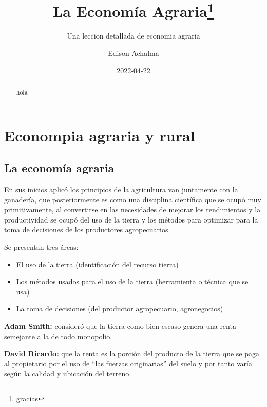 \documentclass[
  letterpaper,
  DIV=11,
  numbers=noendperiod]{scrartcl}
\title{La Economía Agraria\thanks{gracias}}
\subtitle{Una leccion detallada de economia agraria}
\author{Edison Achalma}
\date{2022-04-22}
\begin{document}
\maketitle
\begin{abstract}
hola
\end{abstract}
\ifdefined\Shaded\renewenvironment{Shaded}{\begin{tcolorbox}[frame hidden, enhanced, boxrule=0pt, borderline west={3pt}{0pt}{shadecolor}, interior hidden, sharp corners, breakable]}{\end{tcolorbox}}\fi

\hypertarget{econompia-agraria-y-rural}{%
\section{Econompia agraria y rural}\label{econompia-agraria-y-rural}}

\hypertarget{la-economuxeda-agraria}{%
\subsection{La economía agraria}\label{la-economuxeda-agraria}}

En sus inicios aplicó los principios de la agricultura van juntamente
con la ganadería, que posteriormente es como una disciplina científica
que se ocupó muy primitivamente, al convertirse en las necesidades de
mejorar los rendimientos y la productividad se ocupó del uso de la
tierra y los métodos para optimizar para la toma de decisiones de los
productores agropecuarios.

Se presentan tres áreas:

\begin{itemize}
\item
  El uso de la tierra (identificación del recurso tierra)
\item
  Los métodos usados para el uso de la tierra (herramienta o técnica que
  se usa)
\item
  La toma de decisiones (del productor agropecuario, agronegocios)
\end{itemize}

\textbf{Adam Smith:} consideró que la tierra como bien escaso genera una
renta semejante a la de todo monopolio.

\textbf{David Ricardo:} que la renta es la porción del producto de la
tierra que se paga al propietario por el uso de ``las fuerzas
originarias'' del suelo y por tanto varía según la calidad y ubicación
del terreno.
\end{document}
